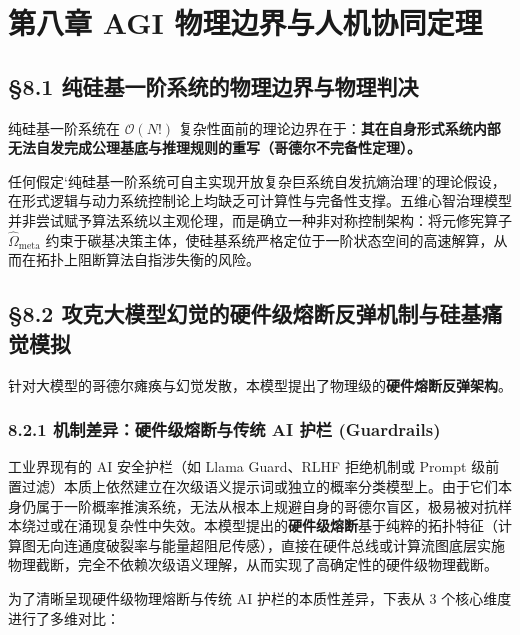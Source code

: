 \documentclass[11pt,a4paper,oneside]{ctexart}
\begin{document}
\section{第八章 AGI 物理边界与人机协同定理}

\subsection{§8.1 纯硅基一阶系统的物理边界与物理判决}

纯硅基一阶系统在 $\mathcal{O}(N!)$ 复杂性面前的理论边界在于：\textbf{其在自身形式系统内部无法自发完成公理基底与推理规则的重写（哥德尔不完备性定理）。}


任何假定‘纯硅基一阶系统可自主实现开放复杂巨系统自发抗熵治理’的理论假设，在形式逻辑与动力系统控制论上均缺乏可计算性与完备性支撑。五维心智治理模型并非尝试赋予算法系统以主观伦理，而是确立一种非对称控制架构：将元修宪算子 $\hat{\Omega}_{\text{meta}}$ 约束于碳基决策主体，使硅基系统严格定位于一阶状态空间的高速解算，从而在拓扑上阻断算法自指涉失衡的风险。


\subsection{§8.2 攻克大模型幻觉的硬件级熔断反弹机制与硅基痛觉模拟}

针对大模型的哥德尔瘫痪与幻觉发散，本模型提出了物理级的\textbf{硬件熔断反弹架构}。


\subsubsection{8.2.1 机制差异：硬件级熔断与传统 AI 护栏 (Guardrails)}

工业界现有的 AI 安全护栏（如 Llama Guard、RLHF 拒绝机制或 Prompt 级前置过滤）本质上依然建立在次级语义提示词或独立的概率分类模型上。由于它们本身仍属于一阶概率推演系统，无法从根本上规避自身的哥德尔盲区，极易被对抗样本绕过或在涌现复杂性中失效。本模型提出的\textbf{硬件级熔断}基于纯粹的拓扑特征（计算图无向连通度破裂率与能量超阻尼传感），直接在硬件总线或计算流图底层实施物理截断，完全不依赖次级语义理解，从而实现了高确定性的硬件级物理截断。


为了清晰呈现硬件级物理熔断与传统 AI 护栏的本质性差异，下表从 3 个核心维度进行了多维对比：
\end{document}
